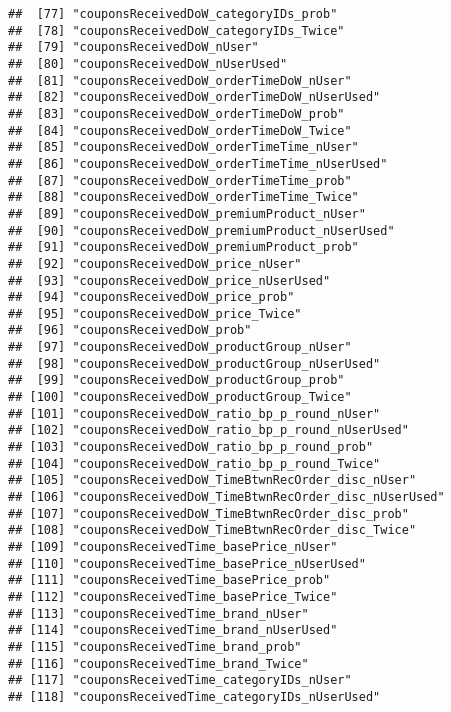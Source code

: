 \documentclass[10pt]{report}
\begin{document}
\begin{verbatim}
##  [77] "couponsReceivedDoW_categoryIDs_prob"                
##  [78] "couponsReceivedDoW_categoryIDs_Twice"               
##  [79] "couponsReceivedDoW_nUser"                           
##  [80] "couponsReceivedDoW_nUserUsed"                       
##  [81] "couponsReceivedDoW_orderTimeDoW_nUser"              
##  [82] "couponsReceivedDoW_orderTimeDoW_nUserUsed"          
##  [83] "couponsReceivedDoW_orderTimeDoW_prob"               
##  [84] "couponsReceivedDoW_orderTimeDoW_Twice"              
##  [85] "couponsReceivedDoW_orderTimeTime_nUser"             
##  [86] "couponsReceivedDoW_orderTimeTime_nUserUsed"         
##  [87] "couponsReceivedDoW_orderTimeTime_prob"              
##  [88] "couponsReceivedDoW_orderTimeTime_Twice"             
##  [89] "couponsReceivedDoW_premiumProduct_nUser"            
##  [90] "couponsReceivedDoW_premiumProduct_nUserUsed"        
##  [91] "couponsReceivedDoW_premiumProduct_prob"             
##  [92] "couponsReceivedDoW_price_nUser"                     
##  [93] "couponsReceivedDoW_price_nUserUsed"                 
##  [94] "couponsReceivedDoW_price_prob"                      
##  [95] "couponsReceivedDoW_price_Twice"                     
##  [96] "couponsReceivedDoW_prob"                            
##  [97] "couponsReceivedDoW_productGroup_nUser"              
##  [98] "couponsReceivedDoW_productGroup_nUserUsed"          
##  [99] "couponsReceivedDoW_productGroup_prob"               
## [100] "couponsReceivedDoW_productGroup_Twice"              
## [101] "couponsReceivedDoW_ratio_bp_p_round_nUser"          
## [102] "couponsReceivedDoW_ratio_bp_p_round_nUserUsed"      
## [103] "couponsReceivedDoW_ratio_bp_p_round_prob"           
## [104] "couponsReceivedDoW_ratio_bp_p_round_Twice"          
## [105] "couponsReceivedDoW_TimeBtwnRecOrder_disc_nUser"     
## [106] "couponsReceivedDoW_TimeBtwnRecOrder_disc_nUserUsed" 
## [107] "couponsReceivedDoW_TimeBtwnRecOrder_disc_prob"      
## [108] "couponsReceivedDoW_TimeBtwnRecOrder_disc_Twice"     
## [109] "couponsReceivedTime_basePrice_nUser"                
## [110] "couponsReceivedTime_basePrice_nUserUsed"            
## [111] "couponsReceivedTime_basePrice_prob"                 
## [112] "couponsReceivedTime_basePrice_Twice"                
## [113] "couponsReceivedTime_brand_nUser"                    
## [114] "couponsReceivedTime_brand_nUserUsed"                
## [115] "couponsReceivedTime_brand_prob"                     
## [116] "couponsReceivedTime_brand_Twice"                    
## [117] "couponsReceivedTime_categoryIDs_nUser"              
## [118] "couponsReceivedTime_categoryIDs_nUserUsed"          

\end{verbatim}
\end{document}
